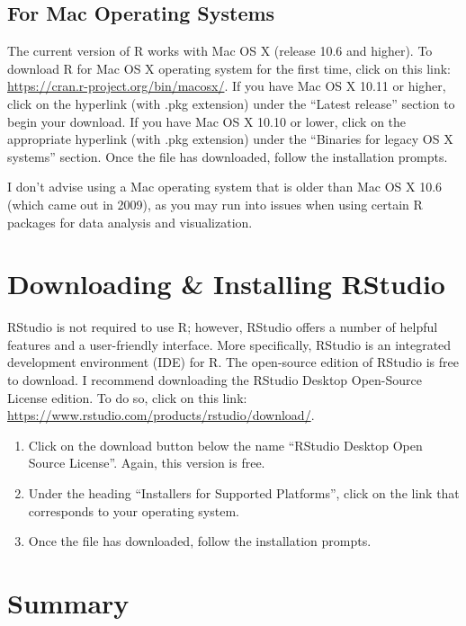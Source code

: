 \documentclass[]{book}
\providecommand{\tightlist}{%
  \setlength{\itemsep}{0pt}\setlength{\parskip}{0pt}}
\begin{document}
\subsection{For Mac Operating Systems}\label{for-mac-operating-systems}

The current version of R works with Mac OS X (release 10.6 and higher).
To download R for Mac OS X operating system for the first time, click on
this link: \url{https://cran.r-project.org/bin/macosx/}. If you have Mac
OS X 10.11 or higher, click on the hyperlink (with .pkg extension) under
the ``Latest release'' section to begin your download. If you have Mac
OS X 10.10 or lower, click on the appropriate hyperlink (with .pkg
extension) under the ``Binaries for legacy OS X systems'' section. Once
the file has downloaded, follow the installation prompts.

I don't advise using a Mac operating system that is older than Mac OS X
10.6 (which came out in 2009), as you may run into issues when using
certain R packages for data analysis and visualization.

\section{Downloading \& Installing
RStudio}\label{downloading-installing-rstudio}

RStudio is not required to use R; however, RStudio offers a number of
helpful features and a user-friendly interface. More specifically,
RStudio is an integrated development environment (IDE) for R. The
open-source edition of RStudio is free to download. I recommend
downloading the RStudio Desktop Open-Source License edition. To do so,
click on this link:
\url{https://www.rstudio.com/products/rstudio/download/}.

\begin{enumerate}
\def\labelenumi{\arabic{enumi}.}
\tightlist
\item
  Click on the download button below the name ``RStudio Desktop Open
  Source License''. Again, this version is free.\\
\item
  Under the heading ``Installers for Supported Platforms'', click on the
  link that corresponds to your operating system.\\
\item
  Once the file has downloaded, follow the installation prompts.
\end{enumerate}

\section{Summary}\label{summary}
\end{document}
